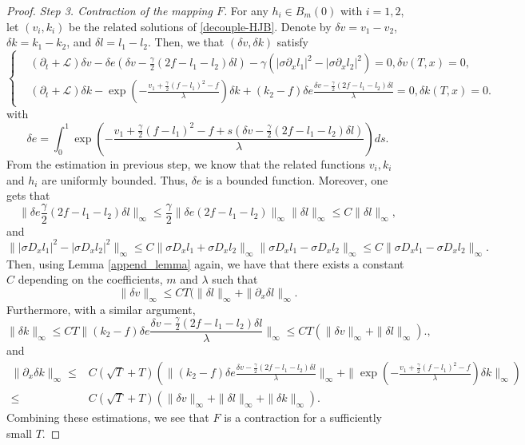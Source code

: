 \documentclass[10pt,a4paper]{amsart}
\begin{document}
\begin{proof}
{\it Step 3. Contraction of the mapping $F$.}
For any $h_i \in B_m(0)$ with $i=1,2$, let $(v_i,k_i)$ be the related solutions of \eqref{decouple-HJB}.  Denote by $\delta v=v_1-v_2$, $\delta k=k_1-k_2$, and $\delta l=l_1-l_2$. Then, we that $(\delta v,\delta k)$ satisfy 
\begin{equation}\label{delta-HJB}
\left\{
\begin{split}
&(\partial_t+\mathcal L)\delta v- \delta e(\delta v-\frac\gamma 2(2f-l_1-l_2)\delta l)-\gamma(|\sigma \partial_x l_1|^2-|\sigma \partial_x l_2|^2)=0, \delta v(T,x)=0,\\
& (\partial_t+\mathcal L) \delta k-\exp(-\frac{v_1+\frac{\gamma}{2}(f-l_1)^2-f}{\lambda})\delta k+(k_2-f)\delta e\frac{\delta v-\frac\gamma 2(2f-l_1-l_2)\delta l}{\lambda} =0,\delta k(T,x)=0.
\end{split}
\right.
\end{equation}
with 
$$
\delta e=\int_0^1 \exp(-\frac{v_1+\frac{\gamma}{2}(f-l_1)^2-f+s(\delta v-\frac\gamma 2(2f-l_1-l_2)\delta l)}{\lambda})ds.
$$
From the estimation in previous step, we know that  the related functions $v_i,k_i$ and $h_i$ are uniformly bounded. Thus, $\delta e$ is a bounded function. Moreover, one gets that 
$$
\|\delta e \frac \gamma2(2f-l_1-l_2)\delta l\|_\infty \le \frac\gamma 2\| \delta e(2f-l_1-l_2)\|_{\infty}\|\delta l\|_\infty \le C\|\delta l\|_\infty,
$$
and 
$$
\||\sigma D_x l_1|^2-|\sigma D_x l_2|^2 \|_\infty \le C\| \sigma D_x l_1+\sigma D_x l_2\|_\infty\| \sigma D_x l_1-\sigma D_x l_2\|_\infty \le C\| \sigma D_x l_1-\sigma D_x l_2\|_\infty.
$$
Then, using Lemma \ref{append_lemma} again, we have that there exists a constant $C$ depending on the coefficients, $m$ and $\lambda$ such that 
$$
\|\delta v\|_{\infty} \le CT(\|\delta l\|_{\infty}+\|\partial_x \delta l\|_{\infty}. 
$$
Furthermore, with a similar argument, 
$$
\|\delta k\|_\infty \le CT\|(k_2-f)\delta e\frac{\delta v-\frac\gamma 2(2f-l_1-l_2)\delta l}{\lambda}\|_\infty\le CT(\|\delta v\|_\infty+\|\delta l\|_\infty).,
$$
and
\begin{equation*}
\begin{split}
\|\partial_x \delta k\|_{\infty} \le& C(\sqrt{T}+T)(\|(k_2-f)\delta e\frac{\delta v-\frac\gamma 2(2f-l_1-l_2)\delta l}{\lambda}\|_\infty+\|\exp(-\frac{v_1+\frac{\gamma}{2}(f-l_1)^2-f}{\lambda})\delta k\|_\infty)\\
\le&C(\sqrt{T}+T)(\|\delta v\|_\infty+\|\delta l\|_\infty+\|\delta k\|_\infty).
\end{split}
\end{equation*}
Combining these estimations, we  see that $F$ is a contraction for a sufficiently small $T$.
\end{proof}
\end{document}
